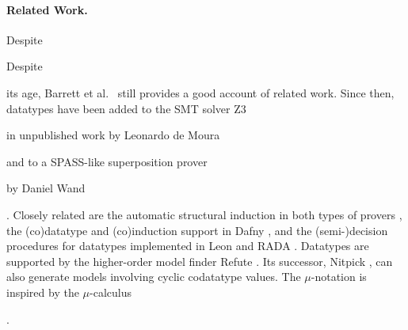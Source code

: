 
\begin{rep}\paragraph{Related Work.} Despite\end{rep}%
\begin{conf}Despite\end{conf} its age,
Barrett et al.\ \cite{barrett-et-al-2007} still provides a good account of
related work. Since then, datatypes have been added to the SMT solver
Z3 \cite{de-moura-bjoerner-2008} \begin{rep}in unpublished work by Leonardo de Moura \end{rep}and to a SPASS-like %
superposition prover \begin{rep}by Daniel Wand\end{rep} \cite{wand-2014}.
Closely related are the automatic structural
induction in both types of provers \cite{kersani-peltier-2013,cruanes-201x,wand-weidenbach-201x,reynolds-kuncak-2015},
the (co)datatype and (co)induction support in Dafny \cite{leino-moskal-2014},
and the (semi-)decision procedures for datatypes
implemented in Leon \cite{suter-et-al-2011} and RADA \cite{pham-et-al-2013}.
%
Datatypes are supported by the higher-order model finder Refute
\cite{weber-2008}. Its successor, Nitpick \cite{blanchette-nipkow-2010}, can
also generate models involving cyclic codatatype values. The $\mu$-notation is
inspired by the $\mu$-calculus
\begin{conf}\cite{kozen-1983}\end{conf}%
\begin{rep}\cite[etc.]{kozen-1983,endrullis-et-al-2011}\end{rep}%
.


%

